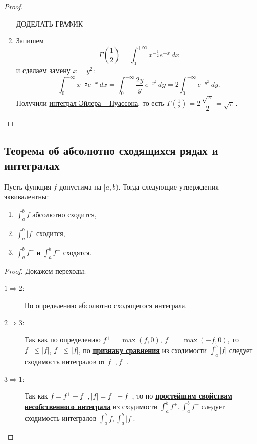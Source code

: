 \begin{proof}
\begin{enumerate}
		ДОДЕЛАТЬ ГРАФИК
		\item Запишем \[
			\Gamma \left(\frac{1}{2} \right) = \int_{0}^{+\infty} x^{-\frac{1}{2}} e^{-x} \, dx
		\]
		и сделаем замену \(x = y^2\): \[
			\int_{0}^{+\infty} x^{-\frac{1}{2}} e^{-x} \, dx = \int_{0}^{+\infty} \frac{2y}{y} \, e^{-y^2} \, dy = 2 \int_{0}^{+\infty} e^{-y^2} \, dy.
		\]
		Получили \hyperlink{puas}{интеграл Эйлера -- Пуассона}, то есть \(\Gamma \left(\frac{1}{2} \right) = 2 \, \dfrac{\sqrt{\pi}}{2} = \sqrt{\pi}\).
	\end{enumerate}
\end{proof}

\subsection{Теорема об абсолютно сходящихся рядах и интегралах}

\begin{ntheorem} \hypertarget{t42}{}
	Пусть функция \(f\) допустима на \([a, b)\). Тогда следующие утверждения эквивалентны:
	\begin{enumerate}
		\item \(\int_{a}^{b} f\) абсолютно сходится,
		\item \(\int_{a}^{b} |f|\) сходится,
		\item \(\int_{a}^{b} f^+\) и \(\int_{a}^{b} f^-\) сходятся.
	\end{enumerate} 
\end{ntheorem}
\begin{proof}
	Докажем переходы:
	\begin{description}
		\item[\(1 \Rightarrow 2\):] По определению абсолютно сходящегося интеграла.
		\item[\(2 \Rightarrow 3\):] Так как по определению \(f^+ = \max (f, 0)\), \(f^- = \max (-f, 0)\), то \(f^+ \leqslant |f|\), \(f^- \leqslant |f|\), по \hyperlink{priz}{\bfseries признаку сравнения} из сходимости \(\int_{a}^{b} |f|\) следует сходимость интегралов от \(f^+, f^-\).
		\item[\(3 \Rightarrow 1\):] Так как \(f = f^+ - f^-, |f| = f^+ + f^-\), то по \hyperlink{svva}{\bfseries простейшим свойствам несобственного интеграла} из сходимости \(\int_{a}^{b} f^+, \int_{a}^{b} f^-\) следует сходимость интегралов \(\int_{a}^{b} f, \int_{a}^{b} |f|\).
	\end{description}
\end{proof}

